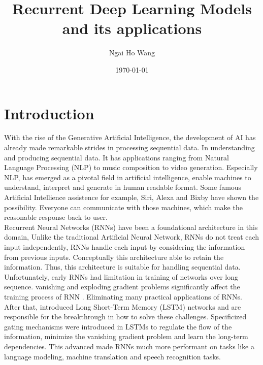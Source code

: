 \documentclass[12pt,a4paper]{article}
\title{Recurrent Deep Learning Models and its applications}
\author{Ngai Ho Wang}
\date{\today}
\begin{document}
\maketitle

\tableofcontents %

\newpage
\section{Introduction}

With the rise of the Generative Artificial Intelligence, the development of AI has already made remarkable strides in processing sequential data. In understanding and producing sequential data. It has applications ranging from Natural Language Processing (NLP) to music composition to video generation. Especially NLP, has emerged as a pivotal field in artificial intelligence, enable machines to understand, interpret and generate in human readable format. Some famous Artificial Intellience assistence for example, Siri, Alexa and Bixby have shown the possibility. Everyone can communicate with those machines, which make the reasonable response back to user.\\[1ex]
Recurrent Neural Networks (RNNs) have been a foundational architecture in this domain, Unlike the traditional Artificial Neural Network, RNNs do not treat each input independently, RNNs handle each input by considering the information from previous inputs. Conceptually this architecture able to retain the information. Thus, this architecture is suitable for handling sequential data. Unfortunately, early RNNs had limitation in training of networks over long sequence. vanishing and exploding gradient problems significantly affect the training process of RNN \parencite{bengio1994learning}. Eliminating many practical applications of RNNs. After that, \parencite{hochreiter1997lstm} introduced Long Short-Term Memory (LSTM) networks and are responsible for the breakthrough in how to solve these challenges. Specificized gating mechanisms were introduced in LSTMs to regulate the flow of the information, minimize the vanishing gradient problem and learn the long-term dependencies. This advanced made RNNs much more performant on tasks like a language modeling, machine translation and speech recognition tasks.\\[1ex]
\end{document}
